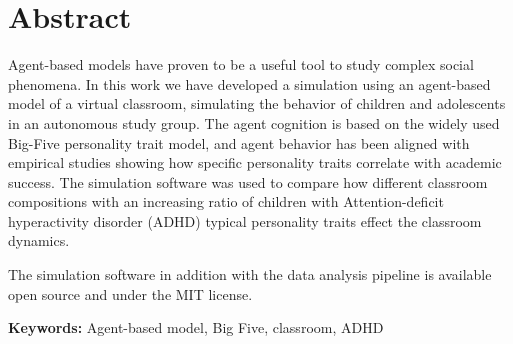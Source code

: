 \chapter{Abstract}

Agent-based models have proven to be a useful tool to study complex social phenomena.
In this work we have developed a simulation using an agent-based model of a virtual
classroom, simulating the behavior of children and adolescents in an autonomous
study group. The agent cognition is based on the widely used Big-Five personality
trait model, and agent behavior has been aligned with empirical studies showing
how specific personality traits correlate with academic success. The simulation
software was used to compare how different classroom compositions with an increasing
ratio of children with Attention-deficit hyperactivity disorder (ADHD) typical
personality traits effect the classroom dynamics.

\bb

The simulation software in addition with the data analysis pipeline is available
open source and under the MIT license. 

\bb

{\bf Keywords:} Agent-based model, Big Five, classroom, ADHD